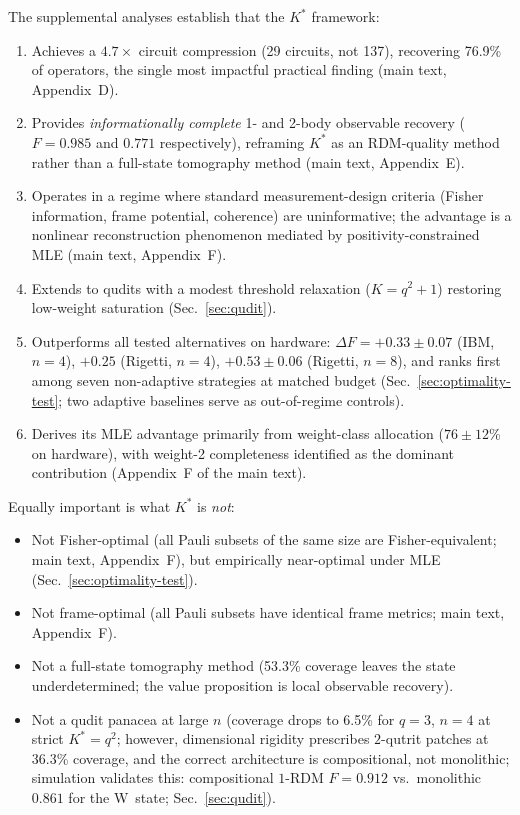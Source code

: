 \documentclass[twocolumn,prx,aps,superscriptaddress,longbibliography]{revtex4-2}
\begin{document}
The supplemental analyses establish that the $K^*$ framework:
\begin{enumerate}
\item Achieves a $4.7\times$ circuit compression (29 circuits, not
137), recovering 76.9\% of operators, the single most impactful
practical finding (main text, Appendix~D).
\item Provides \emph{informationally complete} 1- and 2-body
observable recovery ($F = 0.985$ and $0.771$ respectively),
reframing $K^*$ as an RDM-quality method rather than a full-state
tomography method (main text, Appendix~E).
\item Operates in a regime where standard measurement-design
criteria (Fisher information, frame potential, coherence) are
uninformative; the advantage is a nonlinear reconstruction
phenomenon mediated by positivity-constrained MLE
(main text, Appendix~F).
\item Extends to qudits with a modest threshold relaxation
($K = q^2 + 1$) restoring low-weight saturation
(Sec.~\ref{sec:qudit}).
\item Outperforms all tested alternatives on hardware:
$\Delta F = +0.33 \pm 0.07$ (IBM, $n = 4$), $+0.25$ (Rigetti,
$n = 4$), $+0.53 \pm 0.06$ (Rigetti, $n = 8$), and ranks first
among seven non-adaptive strategies at matched budget
(Sec.~\ref{sec:optimality-test}; two adaptive baselines serve as
out-of-regime controls).
\item Derives its MLE advantage primarily from weight-class
allocation ($76 \pm 12$\% on hardware), with weight-2 completeness
identified as the dominant contribution
(Appendix~F of the main text).
\end{enumerate}

Equally important is what $K^*$ is \emph{not}:
\begin{itemize}
\item Not Fisher-optimal (all Pauli subsets of the same size are
Fisher-equivalent; main text, Appendix~F), but empirically
near-optimal under MLE (Sec.~\ref{sec:optimality-test}).
\item Not frame-optimal (all Pauli subsets have identical frame
metrics; main text, Appendix~F).
\item Not a full-state tomography method (53.3\% coverage leaves
the state underdetermined; the value proposition is local
observable recovery).
\item Not a qudit panacea at large $n$ (coverage drops to 6.5\%
for $q = 3$, $n = 4$ at strict $K^* = q^2$; however, dimensional
rigidity prescribes $2$-qutrit patches at 36.3\% coverage, and the
correct architecture is compositional, not monolithic;
simulation validates this: compositional $1$-RDM $F = 0.912$
vs.\ monolithic $0.861$ for the W~state;
Sec.~\ref{sec:qudit}).
\end{itemize}
\end{document}
